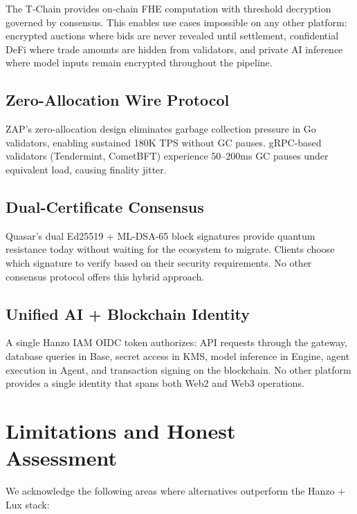 \documentclass[11pt,twocolumn]{article}
\begin{document}
The T-Chain provides on-chain FHE computation with threshold decryption governed by consensus. This enables use cases impossible on any other platform: encrypted auctions where bids are never revealed until settlement, confidential DeFi where trade amounts are hidden from validators, and private AI inference where model inputs remain encrypted throughout the pipeline.

\subsection{Zero-Allocation Wire Protocol}

ZAP's zero-allocation design eliminates garbage collection pressure in Go validators, enabling sustained 180K TPS without GC pauses. gRPC-based validators (Tendermint, CometBFT) experience 50--200ms GC pauses under equivalent load, causing finality jitter.

\subsection{Dual-Certificate Consensus}

Quasar's dual Ed25519 + ML-DSA-65 block signatures provide quantum resistance today without waiting for the ecosystem to migrate. Clients choose which signature to verify based on their security requirements. No other consensus protocol offers this hybrid approach.

\subsection{Unified AI + Blockchain Identity}

A single Hanzo IAM OIDC token authorizes: API requests through the gateway, database queries in Base, secret access in KMS, model inference in Engine, agent execution in Agent, and transaction signing on the blockchain. No other platform provides a single identity that spans both Web2 and Web3 operations.

\section{Limitations and Honest Assessment}
\label{sec:limitations}

We acknowledge the following areas where alternatives outperform the Hanzo + Lux stack:
\end{document}

